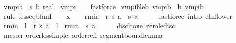 \begin{isabellebody}
\isanewline
{}\isamarkupfalse%
\ v{}{\isacharunderscore}{\kern0pt}mpi\isactrlsub b\ {\isacharcolon}{\kern0pt}{\isacharcolon}{\kern0pt}\ {\isachardoublequoteopen}{\isacharprime}{\kern0pt}s\ {\isasymRightarrow}\isactrlsub b\ real{\isachardoublequoteclose}\ \ {\isachardoublequoteopen}v{}{\isacharunderscore}{\kern0pt}mpi{\isachardoublequoteclose}\isanewline
%
\isadelimproof
\ \ %
\endisadelimproof
%
\isatagproof
{}\isamarkupfalse%
\ fastforce%
\endisatagproof
{\isafoldproof}%
%
\isadelimproof
\isanewline
%
\endisadelimproof
\isanewline
{}\isamarkupfalse%
\ v{}{\isacharunderscore}{\kern0pt}mpi\isactrlsub b{\isacharunderscore}{\kern0pt}le{\isacharunderscore}{\kern0pt}{\isasymL}\isactrlsub b{\isacharcolon}{\kern0pt}\ {\isachardoublequoteopen}v{}{\isacharunderscore}{\kern0pt}mpi\isactrlsub b\ {\isasymle}\ {\isasymL}\isactrlsub b\ v{}{\isacharunderscore}{\kern0pt}mpi\isactrlsub b{\isachardoublequoteclose}\isanewline
%
\isadelimproof
%
\endisadelimproof
%
\isatagproof
{}\isamarkupfalse%
\ {\isacharparenleft}{\kern0pt}rule\ less{\isacharunderscore}{\kern0pt}eq{\isacharunderscore}{\kern0pt}bfunI{\isacharparenright}{\kern0pt}\isanewline
\ \ \isamarkupfalse%
\ x\isanewline
\ \ \isamarkupfalse%
\ {\isachardoublequoteopen}r{\isacharunderscore}{\kern0pt}min\ {\isasymle}\ r\ {\isacharparenleft}{\kern0pt}s{\isacharcomma}{\kern0pt}\ a{\isacharparenright}{\kern0pt}{\isachardoublequoteclose}\ \ s\ a\isanewline
\ \ \ \ \isamarkupfalse%
\ {\isacharparenleft}{\kern0pt}fastforce\ intro{\isacharcolon}{\kern0pt}\ cInf{\isacharunderscore}{\kern0pt}lower{}{\isacharparenright}{\kern0pt}\isanewline
\ \ \isamarkupfalse%
\ {\isachardoublequoteopen}r{\isacharunderscore}{\kern0pt}min\ {\isasymle}\ {\isacharparenleft}{\kern0pt}{}{\isacharminus}{\kern0pt}l{\isacharparenright}{\kern0pt}\ {\isacharasterisk}{\kern0pt}\ r\ {\isacharparenleft}{\kern0pt}s{\isacharcomma}{\kern0pt}\ a{\isacharparenright}{\kern0pt}\ {\isacharplus}{\kern0pt}\ l\ {\isacharasterisk}{\kern0pt}\ r{\isacharunderscore}{\kern0pt}min{\isachardoublequoteclose}\ \ s\ a\isanewline
\ \ \ \ \isamarkupfalse%
\ disc{\isacharunderscore}{\kern0pt}lt{\isacharunderscore}{\kern0pt}one\ zero{\isacharunderscore}{\kern0pt}le{\isacharunderscore}{\kern0pt}disc\isanewline
\ \ \ \ \isamarkupfalse%
\ {\isacharparenleft}{\kern0pt}meson\ order{\isacharunderscore}{\kern0pt}less{\isacharunderscore}{\kern0pt}imp{\isacharunderscore}{\kern0pt}le\ order{\isacharunderscore}{\kern0pt}refl\ segment{\isacharunderscore}{\kern0pt}bound{\isacharunderscore}{\kern0pt}lemma{\isacharparenright}{\kern0pt}\isanewline

\end{isabellebody}
